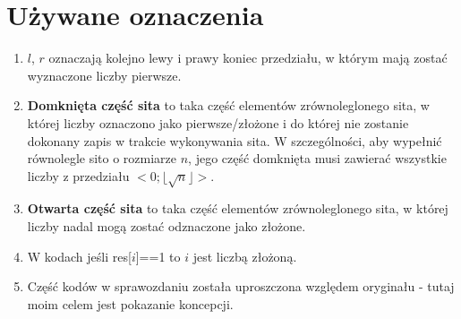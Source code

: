 \documentclass[12pt]{article}
\begin{document}
\section{Używane oznaczenia}
\begin{enumerate}
	\item \(l\), \(r\) oznaczają kolejno lewy i prawy koniec przedziału, w którym mają zostać wyznaczone liczby pierwsze.
	\item \textbf{Domknięta część sita} to taka część elementów zrównoleglonego sita, w której liczby oznaczono jako pierwsze/złożone i do której nie zostanie dokonany zapis w trakcie wykonywania sita. W szczególności, aby wypełnić równolegle sito o rozmiarze \(n\), jego część domknięta musi zawierać wszystkie liczby z przedziału \(<0;\lfloor\sqrt{n}\rfloor>\).
	\item \textbf{Otwarta część sita} to taka część elementów zrównoleglonego sita, w której liczby nadal mogą zostać odznaczone jako złożone.
	\item W kodach jeśli res[\(i\)]==1 to \(i\) jest liczbą złożoną.
	\item Część kodów w sprawozdaniu została uproszczona względem oryginału - tutaj moim celem jest pokazanie koncepcji.
\end{enumerate}
\end{document}
